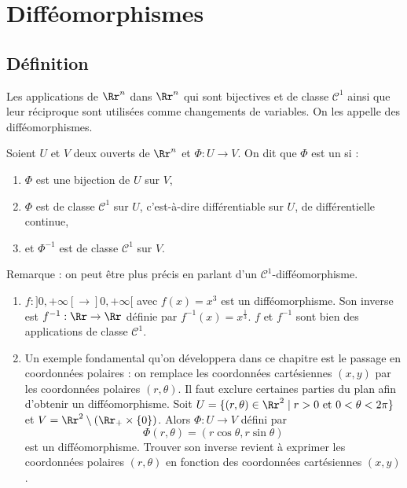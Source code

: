 \documentclass[11pt, class=report,crop=false]{standalone}
\begin{document}


\section{Difféomorphismes}

\subsection{Définition}

Les applications de $\Rr^n$ dans $\Rr^n$ qui sont bijectives et de classe $\mathcal{C}^1$ ainsi que leur réciproque sont utilisées comme changements de variables. On les appelle des difféomorphismes.

\begin{definition}
Soient $U$ et $V$ deux ouverts de $\Rr^n$ et $\Phi:U\to V$.
On dit que $\Phi$ est un  si :
\begin{enumerate}
    \item $\Phi$ est une bijection de $U$ sur $V$,
    \item $\Phi$ est de classe $\mathcal{C}^1$ sur $U$, c'est-à-dire différentiable sur $U$, de différentielle continue,
    \item et $\Phi^{-1}$ est de classe $\mathcal{C}^1$ sur $V$.
\end{enumerate}
\end{definition}

Remarque : on peut être plus précis en parlant d'un $\mathcal{C}^1$-difféomorphisme.

\begin{exemple}
\sauteligne
\begin{enumerate}
    \item $f : ]0,+\infty[ \to ]0,+\infty[$ avec $f(x) = x^3$ est un difféomorphisme. Son inverse est $f^{-1} : \Rr \to \Rr$ définie par $f^{-1}(x) = x^{\frac13}$. $f$ et $f^{-1}$ sont bien des applications de classe $\mathcal{C}^1$.
    
    \item Un exemple fondamental qu'on développera dans ce chapitre est le passage en coordonnées polaires : on remplace les coordonnées cartésiennes $(x,y)$ par les coordonnées polaires $(r,\theta)$.  Il faut exclure certaines parties du plan afin d'obtenir un difféomorphisme.
    Soit $U = \{ (r,\theta) \in \Rr^2 \mid r>0 \text{ et } 0 < \theta < 2\pi \}$ et $V = \Rr^2 \setminus (\Rr_+ \times \{ 0 \})$. Alors
    $\Phi : U \to V$ défini par
    $$\Phi(r,\theta) = (r\cos\theta, r \sin\theta)$$
    est un difféomorphisme.
    Trouver son inverse revient à exprimer les coordonnées polaires $(r,\theta)$ en fonction des coordonnées cartésiennes $(x,y)$.

    
\end{enumerate}    
\end{exemple}
    
\end{document}

